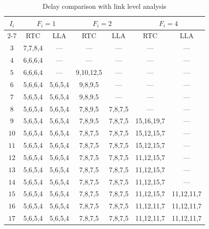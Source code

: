 \documentclass[preprint]{elsarticle}
\begin{document}
\begin{table}[htbp]
\centering
\caption{\label{LLAvsRTC}Delay comparison with link level analysis}
\begin{tabular}{|c|c|c|c|c|c|c|}
\hline
\multirow{3}{*}{$I_i$}  & \multicolumn{2}{|c|}{$F_i=1$} & \multicolumn{2}{|c|}{$F_i=2$}    &   \multicolumn{2}{|c|}{$F_i=4$} \\
\cline{2-7}
& RTC & LLA & RTC & LLA &   RTC &   LLA\\
\hline
$3$ &   7,7,8,4 &   --- &   --- &   ---   &      --- &   --- \\
\hline
$4$ &   6,6,6,4 &   --- &   --- &   ---   &      --- &   --- \\
\hline
$5$ &   6,6,6,4 &   --- &   9,10,12,5 &   ---   &      --- &   --- \\
\hline
$6$ &   5,6,6,4 &   5,6,5,4 &   9,8,9,5 &   ---   &      --- &   --- \\
\hline
$7$ &   5,6,5,4 &   5,6,5,4 &   9,8,9,5 &   --- &      --- &   --- \\
\hline
$8$ &   5,6,5,4 &   5,6,5,4 &   7,8,9,5 &   7,8,7,5 &      --- &   --- \\
\hline
$9$ &   5,6,5,4 &   5,6,5,4 &   7,8,9,5 &   7,8,7,5 &   15,16,19,7 &   --- \\
\hline
$10$    &   5,6,5,4 &   5,6,5,4 &   7,8,7,5 &   7,8,7,5 &   15,12,15,7  &   ---\\
\hline
$11$    &   5,6,5,4 &   5,6,5,4 &   7,8,7,5 &   7,8,7,5 &   15,12,15,7  &   ---\\
\hline
$12$    &   5,6,5,4 &   5,6,5,4 &   7,8,7,5 &   7,8,7,5 &   11,12,15,7  &   ---\\
\hline
$13$    &   5,6,5,4 &   5,6,5,4 &   7,8,7,5 &   7,8,7,5 &   11,12,15,7  &   ---\\
\hline
$14$    &   5,6,5,4 &   5,6,5,4 &   7,8,7,5 &   7,8,7,5 &   11,12,15,7  &   ---\\
\hline
$15$    &   5,6,5,4 &   5,6,5,4 &   7,8,7,5 &   7,8,7,5 &   11,12,15,7  &   11,12,11,7\\
\hline
$16$    &   5,6,5,4 &   5,6,5,4 &   7,8,7,5 &   7,8,7,5 &   11,12,11,7  &   11,12,11,7\\
\hline
$17$    &   5,6,5,4 &   5,6,5,4 &   7,8,7,5 &   7,8,7,5 &   11,12,11,7  &   11,12,11,7\\
\hline
\end{tabular}
\end{table}
\end{document}
